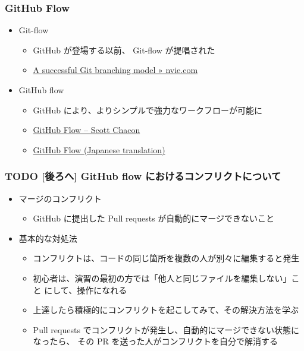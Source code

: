 \documentclass[a4paper,twoside,twocolumn]{bxjsarticle}
\begin{document}
\subsubsection{GitHub Flow}
\label{sec-2-2-3}
\begin{itemize}
\item Git-flow
\begin{itemize}
\item GitHub が登場する以前、 Git-flow が提唱された
\item \href{http://nvie.com/posts/a-successful-git-branching-model/}{A successful Git branching model » nvie.com}
\end{itemize}
\item GitHub flow
\begin{itemize}
\item GitHub により、よりシンプルで強力なワークフローが可能に
\item \href{http://scottchacon.com/2011/08/31/github-flow.html}{GitHub Flow – Scott Chacon}
\item \href{https://gist.github.com/Gab-km/3705015}{GitHub Flow (Japanese translation)}
\end{itemize}
\end{itemize}

\subsubsection{{\bfseries\sffamily TODO} [後ろへ] GitHub flow におけるコンフリクトについて}
\label{sec-2-2-4}
\begin{itemize}
\item マージのコンフリクト
\begin{itemize}
\item GitHub に提出した Pull requests が自動的にマージできないこと
\end{itemize}
\item 基本的な対処法
\begin{itemize}
\item コンフリクトは、コードの同じ箇所を複数の人が別々に編集すると発生
\item 初心者は、演習の最初の方では「他人と同じファイルを編集しない」こと
にして、操作になれる
\item 上達したら積極的にコンフリクトを起こしてみて、その解決方法を学ぶ
\item Pull requests でコンフリクトが発生し、自動的にマージできない状態に
なったら、 その PR を送った人がコンフリクトを自分で解消する
\end{itemize}
\end{itemize}
\end{document}
